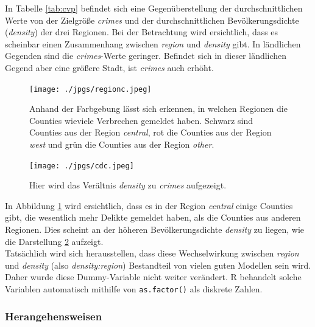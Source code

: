 In Tabelle \ref{tab:cvp} befindet sich eine Gegen\"uberstellung der durchschnittlichen Werte von der Zielgr\"o\ss{}e \textit{crimes} und der durchschnittlichen Bev\"olkerungsdichte (\textit{density}) der drei Regionen.
Bei der Betrachtung wird ersichtlich, dass es scheinbar einen Zusammenhang zwischen \textit{region} und \textit{density} gibt.
In l\"andlichen Gegenden sind die \textit{crimes}-Werte geringer.
Befindet sich in dieser l\"andlichen Gegend aber eine gr\"o\ss{}ere Stadt, ist \textit{crimes} auch erh\"oht.

\begin{figure}
\centering
\texttt{[image: ./jpgs/regionc.jpeg]}
 \abovecaptionskip
\caption{Anhand der Farbgebung l\"asst sich erkennen, in welchen Regionen die Counties wieviele Verbrechen gemeldet haben. Schwarz sind Counties aus der Region \textit{central}, rot die Counties aus der Region \textit{west} und gr\"un die Counties aus der Region \textit{other}.}
\label{fig:rc}
\end{figure}

\begin{figure}
\centering
\texttt{[image: ./jpgs/cdc.jpeg]}
 \abovecaptionskip
\caption{Hier wird das Ver\"altnis \textit{density} zu \textit{crimes} aufgezeigt.}
\label{fig:cdc}
\end{figure}


In Abbildung \ref{fig:rc} wird ersichtlich, dass es in der Region \textit{central} einige Counties gibt, die wesentlich mehr Delikte gemeldet haben, als die Counties aus anderen Regionen.
Dies scheint an der h\"oheren Bev\"olkerungsdichte \textit{density} zu liegen, wie die Darstellung \ref{fig:cdc} aufzeigt. \\
Tats\"achlich wird sich herausstellen, dass diese Wechselwirkung zwischen \textit{region} und \textit{density} (also \textit{density:region}) Bestandteil von vielen guten Modellen sein wird.
Daher wurde diese Dummy-Variable nicht weiter ver\"andert.
\textsf{R} behandelt solche Variablen automatisch mithilfe von \texttt{as.factor()} als diskrete Zahlen.


\subsubsection{Herangehensweisen}
